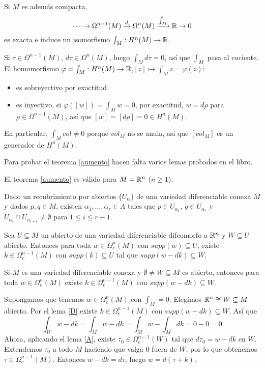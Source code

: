 \documentclass[CV.tex]{subfiles}
\begin{document}
\begin{coro}
Si $M$ es además compacta, 
\[
\cdots\to\Omega^{n-1}(M)\xrightarrow{d}\Omega^{n}(M)\xrightarrow{\int_M}\mathbb{R}\to 0
\]
es exacta e induce un isomorfismo $\int_M:H^n(M)\to\mathbb{R}$. 
\end{coro}
\begin{dem}
Si $\tau\in\Omega^{n-1}(M)$, $d\tau\in\Omega^n(M)$, luego $\int_M d\tau=0$, así que $\int_M$ pasa al cociente.  El homomorfismo $\varphi=\int_M:H^n(M)\to\mathbb{R}$,$[z]\mapsto \int_M z=\varphi(z)$:
\begin{itemize}
\item es sobreyectivo por exactitud.
\item es inyectivo, si $\varphi([w])=\int_M w=0$, por exactitud, $w=d\rho$ para $\rho\in\Omega^{n-1}(M)$, así que $[w]=[d\rho]=0\in H^n(M)$.
\end{itemize}
\QED
\end{dem}

En particular, $\int_M vol\neq 0$ porque $vol_M$ no se anula, así que $[vol_M]$ es un generador de $H^n(M)$. 

Para probar el teorema \ref{aumento} hacen falta varios lemas probados en el libro.
\begin{lemma}\label{A}
El teorema \ref{aumento} es válido para $M=\mathbb{R}^n$ ($n\geq 1$).
\end{lemma}
\begin{lemma}
Dado un recubrimiento por abiertos $\{U_{\alpha}\}$ de una variedad diferenciable conexa $M$ y dados $p,q\in M$, existen $\alpha_1,\dots, \alpha_r\in A$ tales que $p\in U_{\alpha_1}$, $q\in U_{\alpha_r}$ y $U_{\alpha_i}\cap U_{\alpha_{i+1}}\neq\emptyset$ para $1\leq i\leq r-1$.
\end{lemma}
\begin{lemma}
Sea $U\subseteq M$ un abierto de una variedad diferenciable difeomorfo a $\mathbb{R}^n$ y $W\subseteq U$ abierto. Entonces para toda $w\in\Omega_c^n(M)$ con $supp(w)\subseteq U$, existe $k\in\Omega_c^{n-1}(M)$  con $supp(k)\subseteq U$ tal que $supp(w-dk)\subseteq W$. 
\end{lemma}
\begin{lemma}\label{D}
Si $M$ es una variedad diferenciable conexa y $\emptyset\neq W\subseteq M$ es abierto, entonces para toda $w\in\Omega_c^n(M)$ existe $k\in\Omega_c^{n-1}(M)$ con $supp(w-dk)\subseteq W$. 
\end{lemma}

\begin{dem}

Supongamos que tenemos $w\in\Omega^n_c(M)$ con $\int_M=0$. Elegimos $\mathbb{R}^n\cong W\subseteq M$ abierto. Por el lema \ref{D} existe $k\in\Omega_c^{n-1}(M)$ con $supp(w-dk)\subseteq W$. Así que
\[
\int_W w-dk=\int_M w-dk=\int_M w-\int_M dk=0-0=0
\]
Ahora, aplicando el lema \ref{A}, existe $\tau_0\in\Omega_c^{n-1}(W)$ tal que $d\tau_0=w-dk$ en $W$. Extendemos $\tau_0$ a todo $M$ haciendo que valga 0 fuera de $W$, por lo que obtenemos $\tau\in\Omega_c^{n-1}(M)$. Entonces $w-dk=d\tau$, luego $w=d(\tau+k)$. \QED
\end{dem}
\end{document}
